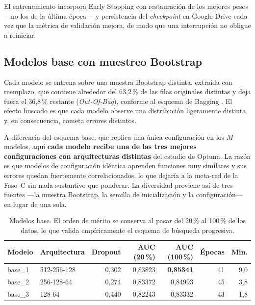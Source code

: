 \documentclass[12pt,a4paper]{article}
\begin{document}
El entrenamiento incorpora Early Stopping con restauración de los mejores pesos ---no los de la
última época--- y persistencia del \emph{checkpoint} en Google Drive cada vez que la métrica de
validación mejora, de modo que una interrupción no obligue a reiniciar.

\subsection{Modelos base con muestreo Bootstrap}

Cada modelo se entrena sobre una muestra Bootstrap \citep{efron} distinta, extraída con reemplazo,
que contiene alrededor del 63,2\,\% de las filas originales distintas y deja fuera el 36,8\,\%
restante (\emph{Out-Of-Bag}), conforme al esquema de Bagging \citep{breiman}. El efecto buscado es
que cada modelo observe una distribución ligeramente distinta y, en consecuencia, cometa errores
distintos.

A diferencia del esquema base, que replica una única configuración en los $M$ modelos, aquí
\textbf{cada modelo recibe una de las tres mejores configuraciones con arquitecturas distintas}
del estudio de Optuna. La razón es que modelos de configuración idéntica aprenden funciones muy
similares y sus errores quedan fuertemente correlacionados, lo que dejaría a la meta-red de la
Fase~C sin nada sustantivo que ponderar. La diversidad proviene así de tres fuentes ---la muestra
Bootstrap, la semilla de inicialización y la configuración--- en lugar de una sola.

\begin{table}[H]
\centering
\caption{Modelos base. El orden de mérito se conserva al pasar del 20\,\% al 100\,\% de los datos,
lo que valida empíricamente el esquema de búsqueda progresiva.}
\label{tab:base}
\small
\begin{tabular}{llrrrrr}
\toprule
\textbf{Modelo} & \textbf{Arquitectura} & \textbf{Dropout} & \textbf{AUC (20\,\%)} & \textbf{AUC (100\,\%)} & \textbf{Épocas} & \textbf{Min.} \\
\midrule
base\_1 & 512-256-128 & 0,302 & 0,83823 & \textbf{0,85341} & 41 & 9,0 \\
base\_2 & 256-128-64  & 0,274 & 0,83372 & 0,84993 & 45 & 3,8 \\
base\_3 & 128-64      & 0,440 & 0,82243 & 0,83332 & 43 & 1,8 \\
\bottomrule
\end{tabular}
\end{table}
\end{document}
